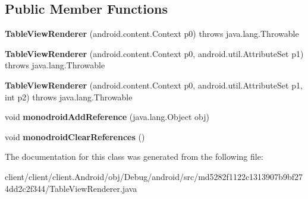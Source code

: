 \subsection*{Public Member Functions}
\begin{DoxyCompactItemize}
\item 
\hypertarget{classmd5282f1122c1313907b9bf274dd2c2f344_1_1TableViewRenderer_a3b346ecbcf6b33ce5a81ab1a13dd2ad2}{}{\bfseries Table\+View\+Renderer} (android.\+content.\+Context p0)  throws java.\+lang.\+Throwable 	\label{classmd5282f1122c1313907b9bf274dd2c2f344_1_1TableViewRenderer_a3b346ecbcf6b33ce5a81ab1a13dd2ad2}

\item 
\hypertarget{classmd5282f1122c1313907b9bf274dd2c2f344_1_1TableViewRenderer_a962c400ac61ae5c3bc25fed477dfdaec}{}{\bfseries Table\+View\+Renderer} (android.\+content.\+Context p0, android.\+util.\+Attribute\+Set p1)  throws java.\+lang.\+Throwable 	\label{classmd5282f1122c1313907b9bf274dd2c2f344_1_1TableViewRenderer_a962c400ac61ae5c3bc25fed477dfdaec}

\item 
\hypertarget{classmd5282f1122c1313907b9bf274dd2c2f344_1_1TableViewRenderer_a5ffb649f9dff09d27c528562c42b4879}{}{\bfseries Table\+View\+Renderer} (android.\+content.\+Context p0, android.\+util.\+Attribute\+Set p1, int p2)  throws java.\+lang.\+Throwable 	\label{classmd5282f1122c1313907b9bf274dd2c2f344_1_1TableViewRenderer_a5ffb649f9dff09d27c528562c42b4879}

\item 
\hypertarget{classmd5282f1122c1313907b9bf274dd2c2f344_1_1TableViewRenderer_abf160c19a869ede7d3462df51f0d681d}{}void {\bfseries monodroid\+Add\+Reference} (java.\+lang.\+Object obj)\label{classmd5282f1122c1313907b9bf274dd2c2f344_1_1TableViewRenderer_abf160c19a869ede7d3462df51f0d681d}

\item 
\hypertarget{classmd5282f1122c1313907b9bf274dd2c2f344_1_1TableViewRenderer_a0742a4cfef6c23e800dd0beeb0740fcf}{}void {\bfseries monodroid\+Clear\+References} ()\label{classmd5282f1122c1313907b9bf274dd2c2f344_1_1TableViewRenderer_a0742a4cfef6c23e800dd0beeb0740fcf}

\end{DoxyCompactItemize}


The documentation for this class was generated from the following file\+:\begin{DoxyCompactItemize}
\item 
client/client/client.\+Android/obj/\+Debug/android/src/md5282f1122c1313907b9bf274dd2c2f344/Table\+View\+Renderer.\+java\end{DoxyCompactItemize}

